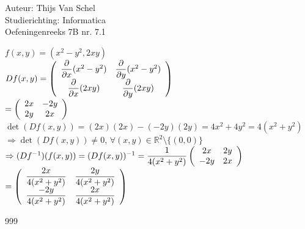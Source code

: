 \documentclass[a4paper]{article}
\begin{document}
  
\noindent \large Auteur: Thijs Van Schel \\
\noindent \large Studierichting: Informatica\\
\noindent \large Oefeningenreeks 7B nr. 7.1\\

\medskip

\normalsize

$f(x,y) = (x^2 - y^2, 2xy)$\\

$Df(x,y) = \left(\begin{array}{c c} \dfrac{\partial}{\partial x}(x^2 - y^2) & \dfrac{\partial}{\partial y}(x^2 - y^2) \\ \dfrac{\partial}{\partial x}(2xy) & \dfrac{\partial}{\partial y}(2xy) \end{array}\right)$\\

$= \left(\begin{array}{c c} 2x & -2y \\ 2y & 2x \end{array}\right)$\\

$\det(Df(x,y)) = (2x)(2x) - (-2y)(2y) = 4x^2 + 4y^2 = 4(x^2 + y^2)$\\

$\Rightarrow \det(Df(x,y)) \neq 0$, $\forall (x,y) \in \mathbb{R}^2 \setminus \{(0,0)\}$\\

$\Rightarrow (Df^{-1})(f(x,y)) = (Df(x,y))^{-1} = \dfrac{1}{4(x^2 + y^2)} \left(\begin{array}{c c} 2x & 2y \\ -2y & 2x \end{array}\right)$\\

$= \left(\begin{array}{c c} \dfrac{2x}{4(x^2 + y^2)} & \dfrac{2y}{4(x^2 + y^2)} \\ \dfrac{-2y}{4(x^2 + y^2)} & \dfrac{2x}{4(x^2 + y^2)} \end{array}\right)$\\

\begin{thebibliography}{999}
\end{thebibliography}
\end{document}
